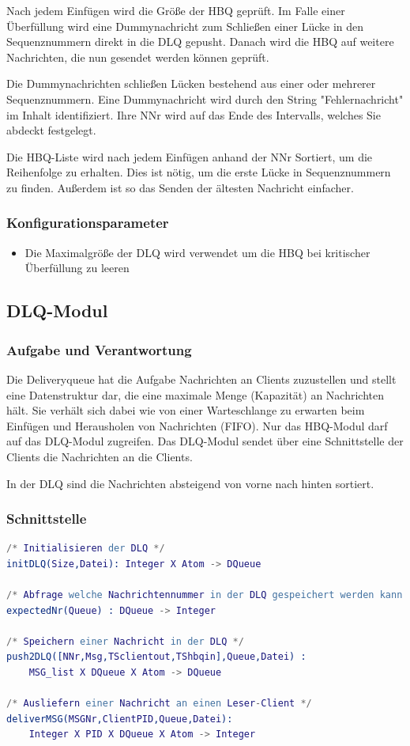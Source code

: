 \documentclass{article}
\begin{document}
Nach jedem Einfügen wird die Größe der HBQ geprüft. Im Falle einer Überfüllung
wird eine Dummynachricht zum Schließen einer Lücke in den Sequenznummern direkt in 
die DLQ gepusht. Danach wird die HBQ auf weitere Nachrichten, die nun gesendet werden können geprüft.

Die Dummynachrichten schließen Lücken bestehend aus einer oder mehrerer Sequenznummern. Eine Dummynachricht wird durch
den String "Fehlernachricht" im Inhalt identifiziert. Ihre NNr wird auf das Ende des Intervalls, welches Sie abdeckt
festgelegt.

Die HBQ-Liste wird nach jedem Einfügen anhand der NNr Sortiert, um die Reihenfolge zu erhalten.
Dies ist nötig, um die erste Lücke in Sequenznummern zu finden. Außerdem ist so das Senden der
ältesten Nachricht einfacher.

\subsubsection{Konfigurationsparameter}
\begin{itemize}
	\item Die Maximalgröße der DLQ wird verwendet um die HBQ bei kritischer Überfüllung zu leeren
\end{itemize}
\newpage

\subsection{DLQ-Modul}
\subsubsection{Aufgabe und Verantwortung}
Die Deliveryqueue hat die Aufgabe Nachrichten an Clients zuzustellen und stellt eine Datenstruktur dar, die eine
maximale Menge (Kapazität) an Nachrichten hält. Sie verhält sich dabei wie von einer Warteschlange zu erwarten beim
Einfügen und Herausholen von Nachrichten (FIFO). Nur das HBQ-Modul darf auf das DLQ-Modul zugreifen. Das DLQ-Modul
sendet über eine Schnittstelle der Clients die Nachrichten an die Clients.

In der DLQ sind die Nachrichten absteigend von vorne nach hinten sortiert.

\subsubsection{Schnittstelle}
\begin{lstlisting}[language=erlang]
/* Initialisieren der DLQ */
initDLQ(Size,Datei): Integer X Atom -> DQueue

/* Abfrage welche Nachrichtennummer in der DLQ gespeichert werden kann */
expectedNr(Queue) : DQueue -> Integer

/* Speichern einer Nachricht in der DLQ */
push2DLQ([NNr,Msg,TSclientout,TShbqin],Queue,Datei) :
    MSG_list X DQueue X Atom -> DQueue

/* Ausliefern einer Nachricht an einen Leser-Client */
deliverMSG(MSGNr,ClientPID,Queue,Datei):
    Integer X PID X DQueue X Atom -> Integer
\end{lstlisting}
\end{document}
